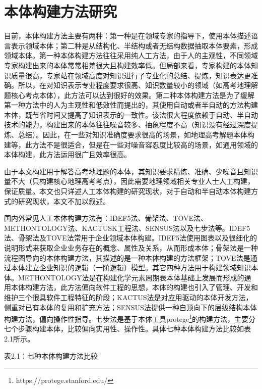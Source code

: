 \section{本体构建方法研究}
目前，本体构建方法\cite{yue}主要有两种：第一种是在领域专家的指导下，使用本体描述语言表示领域本体；第二种是从结构化、半结构或者无结构数据抽取本体要素，形成领域本体。第一种本体构建方法往往采用纯人工方法，由于人的主观性，不同领域专家构建出来的本体常常相差很大且构建效率低。但局部来看，专家构建的本体知识质量很高，专家站在领域高度对知识进行了专业化的总结、提炼，知识表达更准确。所以，在对知识表示专业程度要求很高、知识数量较小的领域（如高考地理解题核心考点本体），此方法可以达到很好的效果。第二种本体构建方法是为了缓解第一种方法中的人为主观性和低效性而提出的，其使用自动或者半自动的方法构建本体，既节省时间又提高了知识表示的一致性。该法很大程度依赖于自动、半自动技术的能力，构建出来的本体往往噪音较多、抽象程度不高（知识没有经过深度提炼、总结）。因此，在一些对知识准确度要求很高的场景，如地理高考解题本体构建等，此方法不是很适合，但是在一些对噪音容忍度比较高的场景，如通用领域的本体构建，此方法运用很广且效率很高。

由于本文构建用于解答高考地理题的本体，其知识要求精炼、准确、少噪音且知识量不大（只构建核心地理高考考点），因此需要地理领域相关专业人士人工构建，保证质量。本文也只详述人工本体构建的研究现状，对于自动和半自动本体构建方式的研究现状，本文不加以叙述。

国内外常见人工本体构建方法有：IDEF5法\cite{IDEF5}、骨架法\cite{skelton}、TOVE法\cite{TOVE}、METHONTOLOGY法\cite{METHONTOLOGY}、KACTUSK工程法\cite{KACTUSK,KACTUSK2}、SENSUS法\cite{SENSUS}以及七步法\cite{seven}等。IDEF5法、骨架法及TOVE法常用于企业领域本体构建。IDEF5法使用图表以及很细化的说明形式来获取企业业务存在的概念、属性及关系，从而形成本体；骨架法是一种流程图导向的本体构建方法，其描述的是一种本体构建的方法框架；TOVE法是通过本体建立企业知识的逻辑（一阶逻辑）模型。其它四种方法用于构建领域知识本体。METHONTOLOGY法是在构建化学元素周期表本体基础上发展而形成的通用本体构建方法，此方法偏向软件工程的思想，本体的构建也引入了管理、开发和维护三个很具软件工程特征的阶段；KACTUS法是对应用驱动的本体开发方法，侧重对已有本体的复用和扩充方法；SENSUS法提供一种自顶向下的层级结构本体构建方法，偏向操作性指导。七步法是基于本体工具protege\footnote{https://protege.stanford.edu/}的构建方法，主要分七个步骤构建本体，比较偏向实用性、操作性。具体七种本体构建方法比较如表2.1所示。

\begin{center}
	\begin{small}
	表2.1：七种本体构建方法比较
	\end{small}
\end{center}

